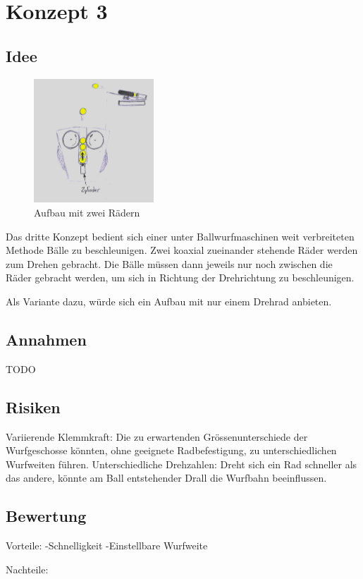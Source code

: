 \section{Konzept 3}

\subsection{Idee}
\begin{figure}[h!]
	\centering
	\includegraphics[width=0.4\textwidth]{../../fig/Wurfmaschine_Drehraeder.png}
	\caption{Aufbau mit zwei Rädern}
	\label{fig:drehradmaschine}
\end{figure}

Das dritte Konzept bedient sich einer unter Ballwurfmaschinen weit verbreiteten Methode Bälle zu beschleunigen. Zwei koaxial zueinander stehende Räder werden zum Drehen gebracht. Die Bälle müssen dann jeweils nur noch zwischen die Räder gebracht werden, um sich in Richtung der Drehrichtung zu beschleunigen.  

Als Variante dazu, würde sich ein Aufbau mit nur einem Drehrad anbieten.


\subsection{Annahmen}
TODO

\subsection{Risiken}
Variierende Klemmkraft: Die zu erwartenden Grössenunterschiede der Wurfgeschosse könnten, ohne geeignete Radbefestigung, zu unterschiedlichen Wurfweiten führen.
Unterschiedliche Drehzahlen: Dreht sich ein Rad schneller als das andere, könnte am Ball entstehender Drall die Wurfbahn beeinflussen.

\subsection{Bewertung}
Vorteile:
-Schnelligkeit
-Einstellbare Wurfweite

Nachteile: